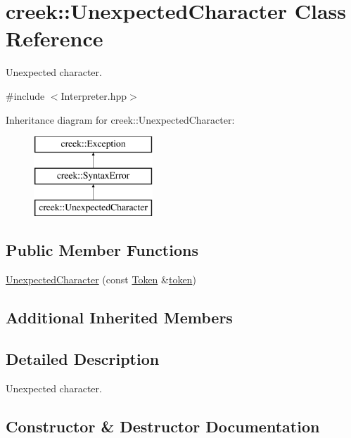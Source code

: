 \hypertarget{classcreek_1_1_unexpected_character}{}\section{creek\+:\+:Unexpected\+Character Class Reference}
\label{classcreek_1_1_unexpected_character}


Unexpected character.  




{\ttfamily \#include $<$Interpreter.\+hpp$>$}

Inheritance diagram for creek\+:\+:Unexpected\+Character\+:\begin{figure}[H]
\begin{center}
\leavevmode
\includegraphics[height=3.000000cm]{classcreek_1_1_unexpected_character}
\end{center}
\end{figure}
\subsection*{Public Member Functions}
\begin{DoxyCompactItemize}
\item 
\hyperlink{classcreek_1_1_unexpected_character_a78c46e99eba4c0cca609f56bb92df065}{Unexpected\+Character} (const \hyperlink{classcreek_1_1_token}{Token} \&\hyperlink{classcreek_1_1_syntax_error_a5d8f72f338fd320cb76f9e1a875e2a35}{token})
\end{DoxyCompactItemize}
\subsection*{Additional Inherited Members}


\subsection{Detailed Description}
Unexpected character. 

\subsection{Constructor \& Destructor Documentation}
